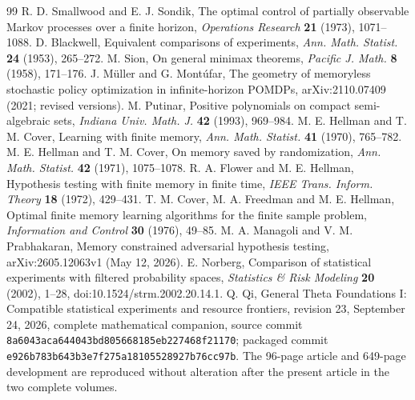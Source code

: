 \documentclass[11pt]{amsart}
\theoremstyle{definition}\newtheorem{definition}[theorem]{Definition}
\theoremstyle{remark}\newtheorem{remark}[theorem]{Remark}
\newcommand{\1}{\mathbf 1}
\begin{document}
\begin{thebibliography}{99}
 R. D. Smallwood and E. J. Sondik,
The optimal control of partially observable Markov processes over a finite horizon,
\emph{Operations Research} \textbf{21} (1973), 1071--1088.
 D. Blackwell, Equivalent comparisons of experiments,
\emph{Ann. Math. Statist.} \textbf{24} (1953), 265--272.
 M. Sion, On general minimax theorems,
\emph{Pacific J. Math.} \textbf{8} (1958), 171--176.
 J. M\"uller and G. Mont\'ufar, The geometry of memoryless
stochastic policy optimization in infinite-horizon POMDPs,
arXiv:2110.07409 (2021; revised versions).
 M. Putinar, Positive polynomials on compact semi-algebraic
sets, \emph{Indiana Univ. Math. J.} \textbf{42} (1993), 969--984.
 M. E. Hellman and T. M. Cover, Learning with finite memory,
\emph{Ann. Math. Statist.} \textbf{41} (1970), 765--782.
 M. E. Hellman and T. M. Cover, On memory saved by
randomization, \emph{Ann. Math. Statist.} \textbf{42} (1971), 1075--1078.
 R. A. Flower and M. E. Hellman, Hypothesis testing with
finite memory in finite time, \emph{IEEE Trans. Inform. Theory}
\textbf{18} (1972), 429--431.
 T. M. Cover, M. A. Freedman and M. E. Hellman, Optimal
finite memory learning algorithms for the finite sample problem,
\emph{Information and Control} \textbf{30} (1976), 49--85.
 M. A. Managoli and V. M. Prabhakaran, Memory constrained
adversarial hypothesis testing, arXiv:2605.12063v1 (May 12, 2026).
 E. Norberg, Comparison of statistical experiments with
filtered probability spaces, \emph{Statistics \& Risk Modeling}
\textbf{20} (2002), 1--28, doi:10.1524/strm.2002.20.14.1.
 Q. Qi, General Theta Foundations I: Compatible
statistical experiments and resource frontiers, revision 23,
September 24, 2026, complete mathematical companion, source commit
\texttt{8a6043aca644043bd805668185eb227468f21170}; packaged commit
\texttt{e926b783b643b3e7f275a18105528927b76cc97b}.
The 96-page article and 649-page development are reproduced without
alteration after the present article in the two complete volumes.
\end{thebibliography}
\end{document}
